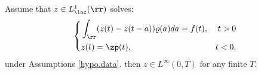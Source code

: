\documentclass[]{jnsao}
\newcommand{\kernel}{\varrho}
\begin{document}
\begin{theorem}\label{thm.comparison}
	Assume that $z \in L^1_\loc(\rr)$ solves:
	\begin{equation}\label{eq.z.comparison}
		\left\{\begin{aligned}
			&	 \int_\rr (z(t)-z(t- a)) \kernel(a) da = f(t), & t>0 \\
			&	z(t) = \zp(t), & t<0,
		\end{aligned}\right.
	\end{equation}
	under Assumptions \ref{hypo.data}. 
	then $z \in L^\infty (0,T)$ for any finite $T$.   
\end{theorem}
 
\end{document}

